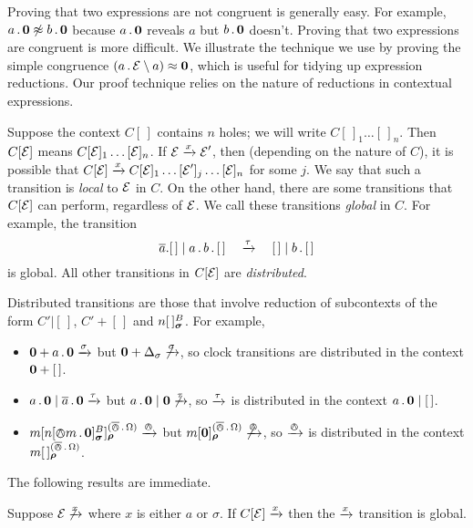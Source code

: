 \documentclass[orivec,envcountsame]{llncs}
\begin{document}
Proving that two expressions are not congruent is generally easy. For
example, $a\,.\,\textbf{0} \not\approx b\,.\,\textbf{0}$ because $a\,.\,\textbf{0}$ reveals $a$
but $b\,.\,\textbf{0}$ doesn't. Proving that two expressions are congruent is
more difficult. We illustrate the technique we use by proving the simple
congruence $\left(a\,.\,\text{$\mathcal{E}$} \setminus {a}\right) \approx \textbf{0}$, which is useful
for tidying up expression reductions. Our proof technique relies on the
nature of reductions in contextual expressions.

Suppose the context $C[\,]$ contains $n$ holes; we will write
$C[\,]_1\dots[\,]_n$. Then $C[\text{$\mathcal{E}$}]$ means $C[\text{$\mathcal{E}$}]_1\dots[\text{$\mathcal{E}$}]_n$. If
$\text{$\mathcal{E}$} \xrightarrow{x} \text{$\mathcal{E}$}'$, then (depending on the nature of $C$), it is possible
that $C[\text{$\mathcal{E}$}] \xrightarrow{x} C[\text{$\mathcal{E}$}]_1\dots[\text{$\mathcal{E}$}']_j\dots[\text{$\mathcal{E}$}]_n$ for some $j$.
We say that such a transition is \emph{local} to $\text{$\mathcal{E}$}$ in $C$. On the other
hand, there are some transitions that $C[\text{$\mathcal{E}$}]$ can perform, regardless of
$\text{$\mathcal{E}$}$. We call these transitions \emph{global} in $C$. For example, the
transition \[ \overline{a}.[\,] \mid a \,.\, b \,.\, [\,] \quad\xrightarrow{\tau}\quad [\,]
\mid b \,.\, [\,] \] is global. All other transitions in $C[\text{$\mathcal{E}$}]$ are
\emph{distributed}.

Distributed transitions are those that involve reduction of subcontexts of the
form $C'|[\,]$, $C' + [\,]$ and $\locv{n}{\,}{B}{\vec{\sigma}}$. For example,

\begin{itemize}
\item
    $\textbf{0} + a\,.\,\textbf{0} \xrightarrow{\sigma}$ but $\textbf{0} + \Delta_\sigma
     \not\xrightarrow{\sigma}$, so clock transitions are distributed in the
     context $\textbf{0} + [\,]$.
\item
    $a\,.\,\textbf{0} \mid \overline{a}\,.\,\textbf{0} \xrightarrow{\tau}$ but $a\,.\,\textbf{0} \mid
     \textbf{0} \not\xrightarrow{\tau}$, so $\xrightarrow{\tau}$ is distributed in the
     context $a\,.\,\textbf{0} \mid [\,]$.
\item
    $\locv{m}{ \locv{n}{\tntout{m}\pref\nil}{B}{\vec{\sigma}}}%
     {(\bout\pref\Omega)}{\vec{\rho}} \Does{\tout}$ but
    $\locv{m}{ \nil }{(\bout\pref\Omega)}{\vec{\rho}} \not\Does{\tout}$,
     so $\xrightarrow{\varowedge}$ is distributed in the context $\locv{m}{\,}%
     {(\bout\pref\Omega)}{\vec{\rho}}$.
\end{itemize}
The following results are immediate.

\begin{proposition}
Suppose $\text{$\mathcal{E}$} \not\xrightarrow{x}$ where $x$ is either $a$ or $\sigma$. If
$C[\text{$\mathcal{E}$}] \xrightarrow{x}$ then the $\xrightarrow{x}$ transition is global.
\end{proposition}
\end{document}

